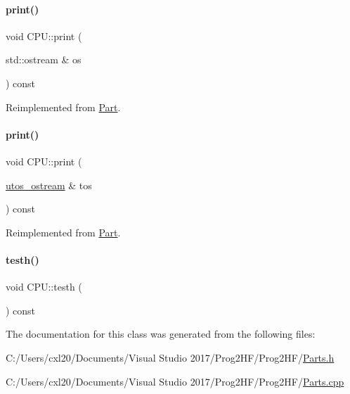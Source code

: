 \paragraph{\texorpdfstring{print()}{print()}\hspace{0.1cm}{\footnotesize\ttfamily [1/2]}}
{\footnotesize\ttfamily void C\+P\+U\+::print (\begin{DoxyParamCaption}\item[{std\+::ostream \&}]{os }\end{DoxyParamCaption}) const\hspace{0.3cm}{\ttfamily [virtual]}}



Reimplemented from \mbox{\hyperlink{class_part_a4fa402b8e8fd4236ff773a7697ab2bc3}{Part}}.

\mbox{\label{class_c_p_u_a0aea700bac0896b9e4434770737078d0}} 
\paragraph{\texorpdfstring{print()}{print()}\hspace{0.1cm}{\footnotesize\ttfamily [2/2]}}
{\footnotesize\ttfamily void C\+P\+U\+::print (\begin{DoxyParamCaption}\item[{\mbox{\hyperlink{structutos__ostream}{utos\+\_\+ostream}} \&}]{tos }\end{DoxyParamCaption}) const\hspace{0.3cm}{\ttfamily [virtual]}}



Reimplemented from \mbox{\hyperlink{class_part_a9ecabe44ba3415badf82c6a23617a41e}{Part}}.

\mbox{\label{class_c_p_u_a9e6b8807b179e06080d52f08e988bd57}} 
\paragraph{\texorpdfstring{testh()}{testh()}}
{\footnotesize\ttfamily void C\+P\+U\+::testh (\begin{DoxyParamCaption}{ }\end{DoxyParamCaption}) const}



The documentation for this class was generated from the following files\+:\begin{DoxyCompactItemize}
\item 
C\+:/\+Users/cxl20/\+Documents/\+Visual Studio 2017/\+Prog2\+H\+F/\+Prog2\+H\+F/\mbox{\hyperlink{_parts_8h}{Parts.\+h}}\item 
C\+:/\+Users/cxl20/\+Documents/\+Visual Studio 2017/\+Prog2\+H\+F/\+Prog2\+H\+F/\mbox{\hyperlink{_parts_8cpp}{Parts.\+cpp}}\end{DoxyCompactItemize}
